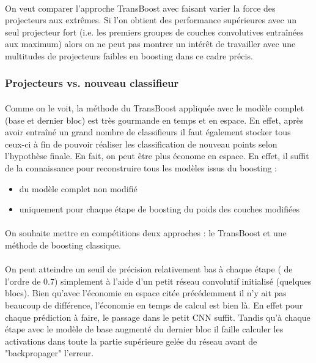 \documentclass[11 pt]{article}
\begin{document}
\paragraph{}On veut comparer l’approche TransBoost avec faisant varier la force des projecteurs aux extrêmes. Si l’on obtient des performance supérieures avec un seul projecteur fort (i.e. les premiers groupes de couches convolutives entraînées aux maximum) alors on ne peut pas montrer un intérêt de travailler avec une multitudes de projecteurs faibles en boosting dans ce cadre précis.

\subsubsection{Projecteurs vs. nouveau classifieur}
\paragraph{}Comme on le voit, la méthode du TransBoost appliquée avec le modèle complet (base et dernier bloc) est très gourmande en temps et en espace. En effet, après avoir entraîné un grand nombre de classifieurs il faut également stocker tous ceux-ci à fin de pouvoir réaliser les classification de nouveau points selon l’hypothèse finale. En fait, on peut être plus économe en espace. En effet, il suffit de la connaissance pour reconstruire tous les modèles issus du boosting :\\ \medskip
\begin{itemize}
  \item du modèle complet non modifié
  \item uniquement pour chaque étape de boosting du poids des couches modifiées
\end{itemize}
\paragraph{}On souhaite mettre en compétitions deux approches : le TransBoost et une méthode de boosting classique.

\paragraph{}On peut atteindre un seuil de précision relativement bas à chaque étape ( de l’ordre de 0.7) simplement à l’aide d’un petit réseau convolutif initialisé (quelques blocs). Bien qu’avec l’économie en espace citée précédemment il n’y ait pas beaucoup de différence, l’économie en temps de calcul est bien là. En effet pour chaque prédiction à faire, le passage dans le petit CNN suffit. Tandis qu’à chaque étape avec le modèle de base augmenté du dernier bloc il faille calculer les activations dans toute la partie supérieure gelée du réseau avant de "backpropager" l’erreur.
\end{document}
